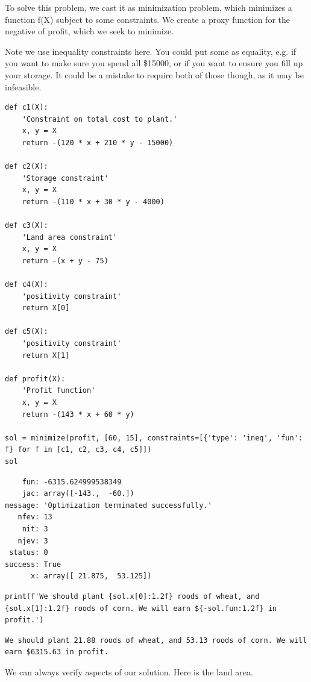 \documentclass[11pt]{article}
\begin{document}
To solve this problem, we cast it as minimization problem, which minimizes a function f(X) subject to some constraints. We create a proxy function for the negative of profit, which we seek to minimize.

Note we use inequality constraints here. You could put some as equality, e.g. if you want to make sure you spend all \$15000, or if you want to ensure you fill up your storage. It could be a mistake to require both of those though, as it may be infeasible.

\begin{verbatim}
def c1(X):
    'Constraint on total cost to plant.'
    x, y = X
    return -(120 * x + 210 * y - 15000)

def c2(X):
    'Storage constraint'
    x, y = X
    return -(110 * x + 30 * y - 4000)

def c3(X):
    'Land area constraint'
    x, y = X
    return -(x + y - 75)

def c4(X):
    'positivity constraint'
    return X[0]

def c5(X):
    'positivity constraint'
    return X[1]

def profit(X):
    'Profit function'
    x, y = X
    return -(143 * x + 60 * y)

sol = minimize(profit, [60, 15], constraints=[{'type': 'ineq', 'fun': f} for f in [c1, c2, c3, c4, c5]])
sol
\end{verbatim}

\begin{verbatim}
    fun: -6315.624999538349
    jac: array([-143.,  -60.])
message: 'Optimization terminated successfully.'
   nfev: 13
    nit: 3
   njev: 3
 status: 0
success: True
      x: array([ 21.875,  53.125])
\end{verbatim}

\begin{verbatim}
print(f'We should plant {sol.x[0]:1.2f} roods of wheat, and {sol.x[1]:1.2f} roods of corn. We will earn ${-sol.fun:1.2f} in profit.')
\end{verbatim}

\begin{verbatim}
We should plant 21.88 roods of wheat, and 53.13 roods of corn. We will earn $6315.63 in profit.

\end{verbatim}

We can always verify aspects of our solution. Here is the land area.
\end{document}
